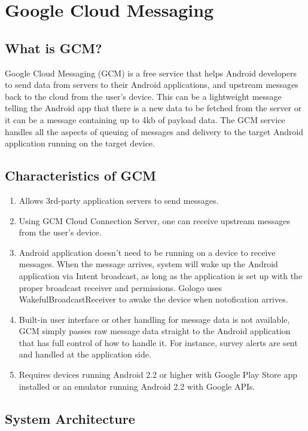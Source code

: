 \chapter {Google Cloud Messaging}
\section{What is GCM?}
\label{sec:gcmlink}
Google Cloud Messaging (GCM) is a free service that helps Android developers to send data from servers to their Android applications, and upstream messages back to the cloud from the user’s device. This can be a lightweight message telling the Android app that there is a new data to be fetched from the server or it can be a message containing up to 4kb of payload data. The GCM service handles all the aspects of queuing of messages and delivery to the target Android application running on the target device.

\section{Characteristics of GCM}
\begin {enumerate}

\item    Allows 3rd-party application servers to send messages.
\item  Using GCM Cloud Connection Server, one can receive upstream messages from the user’s device.
\item Android application doesn’t need to be running on a device to receive messages. When the message arrives, system will wake up the Android application via Intent broadcast, as long as the application is set up with the proper broadcast receiver and permissions. Gologo uses WakefulBroadcastReceiver to awake the device when notofication arrives.
\item Built-in user interface or other handling for message data is not available, GCM simply passes raw message data straight to the Android application that has full control of how to handle it. For instance, survey alerts are sent and handled at the application side.
\item Requires devices running Android 2.2 or higher with Google Play Store app installed or an emulator running Android 2.2 with Google APIs.

\end {enumerate}

\section{ System Architecture}

